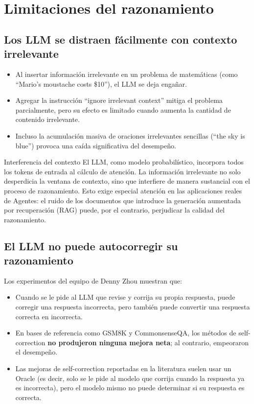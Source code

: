 \section{Limitaciones del razonamiento}

\subsection{Los LLM se distraen fácilmente con contexto irrelevante}

\begin{itemize}
    \item Al insertar información irrelevante en un problema de matemáticas (como ``Mario's moustache costs \$10''), el LLM se deja engañar.
    \item Agregar la instrucción ``ignore irrelevant context'' mitiga el problema parcialmente, pero su efecto es limitado cuando aumenta la cantidad de contenido irrelevante.
    \item Incluso la acumulación masiva de oraciones irrelevantes sencillas (``the sky is blue'') provoca una caída significativa del desempeño.
\end{itemize}

\begin{warningbox}{Interferencia del contexto}
El LLM, como modelo probabilístico, incorpora todos los tokens de entrada al cálculo de atención. La información irrelevante no solo desperdicia la ventana de contexto, sino que interfiere de manera sustancial con el proceso de razonamiento. Esto exige especial atención en las aplicaciones reales de Agentes: el ruido de los documentos que introduce la generación aumentada por recuperación (RAG) puede, por el contrario, perjudicar la calidad del razonamiento.
\end{warningbox}

\subsection{El LLM no puede autocorregir su razonamiento}

Los experimentos del equipo de Denny Zhou muestran que:

\begin{itemize}
    \item Cuando se le pide al LLM que revise y corrija su propia respuesta, puede corregir una respuesta incorrecta, pero también puede convertir una respuesta correcta en incorrecta.
    \item En bases de referencia como GSM8K y CommonsenseQA, los métodos de self-correction \textbf{no produjeron ninguna mejora neta}; al contrario, empeoraron el desempeño.
    \item Las mejoras de self-correction reportadas en la literatura suelen usar un Oracle (es decir, solo se le pide al modelo que corrija cuando la respuesta ya es incorrecta), pero el modelo mismo no puede determinar si su respuesta es correcta.
\end{itemize}

